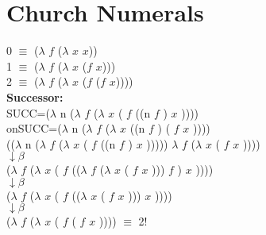 \documentclass{article}
\begin{document}
\section*{Church Numerals}
\begin{flushleft} 
 0 $\equiv$ ($\lambda$ $\mathit{f}$ ($\lambda$ $\mathit{x}$ $\mathit{x}$))\\
 1 $\equiv$ ($\lambda$ $\mathit{f}$ ($\lambda$ $\mathit{x}$ ($\mathit{f}$ $\mathit{x}$)))\\
 2 $\equiv$ ($\lambda$ $\mathit{f}$ ($\lambda$ $\mathit{x}$ ($\mathit{f}$ ($\mathit{f}$ $\mathit{x}$))))\\
\bigskip
\textbf{Successor:}\\
SUCC=($\lambda$ n ($\lambda$  $\mathit{f}$  ($\lambda$  $\mathit{x}$  ( $\mathit{f}$  ((n  $\mathit{f}$ )  $\mathit{x}$ ))))\\
onSUCC=($\lambda$ n ($\lambda$  $\mathit{f}$  ($\lambda$  $\mathit{x}$  ((n  $\mathit{f}$ ) ( $\mathit{f}$   $\mathit{x}$ ))))\\
\bigskip
(($\lambda$ n ($\lambda$  $\mathit{f}$  ($\lambda$  $\mathit{x}$  ( $\mathit{f}$  ((n  $\mathit{f}$ )  $\mathit{x}$ ))))) $\lambda$  $\mathit{f}$  ($\lambda$  $\mathit{x}$  ( $\mathit{f}$   $\mathit{x}$ ))))\\
\bigskip
$\downarrow \beta$\\
\bigskip
($\lambda$  $\mathit{f}$  ($\lambda$  $\mathit{x}$  ( $\mathit{f}$  (($\lambda$  $\mathit{f}$  ($\lambda$  $\mathit{x}$  ( $\mathit{f}$   $\mathit{x}$ )))  $\mathit{f}$ )  $\mathit{x}$ ))))\\
\bigskip
$\downarrow \beta$\\
\bigskip
($\lambda$  $\mathit{f}$  ($\lambda$  $\mathit{x}$  ( $\mathit{f}$  (($\lambda$  $\mathit{x}$  ( $\mathit{f}$   $\mathit{x}$ )))  $\mathit{x}$ ))))\\
\bigskip
$\downarrow \beta$\\
\bigskip
($\lambda$  $\mathit{f}$  ($\lambda$  $\mathit{x}$  ( $\mathit{f}$  ( $\mathit{f}$   $\mathit{x}$ )))) $\equiv$ 2!
\end{flushleft}
\end{document}
